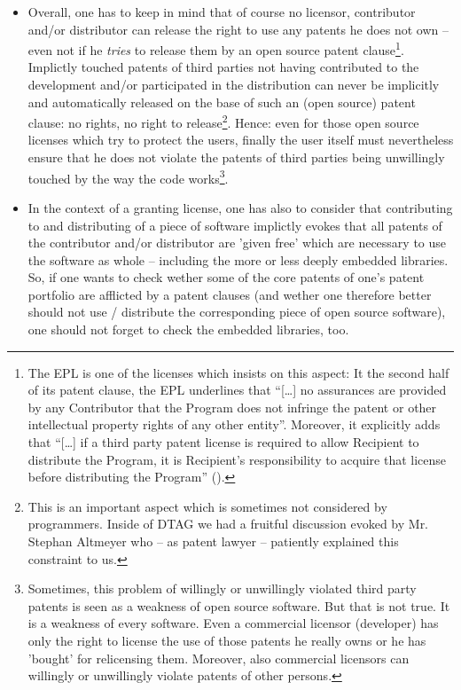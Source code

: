 \begin{itemize}
  
  \item Overall, one has to keep in mind that of course no licensor, contributor
  and/or distributor can release the right to use any patents he does not own --
  even not if he \emph{tries} to release them by an open source patent
  clause\footnote{The EPL is one of the licenses which insists on this aspect:
  It the second half of its patent clause, the EPL underlines that
  \enquote{[\ldots] no assurances are provided by any Contributor that the
  Program does not infringe the patent or other intellectual property rights of
  any other entity}. Moreover, it explicitly adds that \enquote{[\ldots] if a
  third party patent license is required to allow Recipient to distribute the
  Program, it is Recipient's responsibility to acquire that license before
  distributing the Program} (\cite[cf.][\nopage wp.
  §2c]{Epl10OsiLicense2005a}).}. Implictly touched patents of third parties not
  having contributed to the development and/or participated in the distribution
  can never be implicitly and automatically released on the base of such an
  (open source) patent clause: no rights, no right to release\footnote{This is
  an important aspect which is sometimes not considered by programmers. Inside
  of DTAG we had a fruitful discussion evoked by Mr. Stephan Altmeyer who -- as
  patent lawyer -- patiently explained this constraint to us.}. Hence: even for
  those open source licenses which try to protect the users, finally the user
  itself must nevertheless ensure that he does not violate the patents of third
  parties being unwillingly touched by the way the code
  works\footnote{Sometimes, this problem of willingly or unwillingly violated
  third party patents is seen as a weakness of open source software. But that is
  not true. It is a weakness of every software. Even a commercial licensor
  (developer) has only the right to license the use of those patents he really
  owns or he has 'bought' for relicensing them. Moreover, also commercial
  licensors can willingly or unwillingly violate patents of other persons.}.
  
  \item In the context of a granting license, one has also to consider that
  contributing to and distributing of a piece of software implictly evokes that
  all patents of the contributor and/or distributor are 'given free' which are
  necessary to use the software as whole -- including the more or less deeply
  embedded libraries. So, if one wants to check wether some of the core patents
  of one's patent portfolio are afflicted by a patent clauses (and wether one
  therefore better should not use / distribute the corresponding piece of open
  source software), one should not forget to check the embedded libraries, too.
  

\end{itemize}
